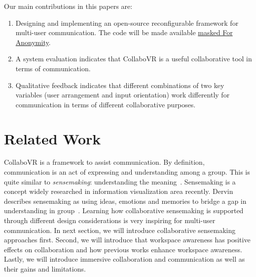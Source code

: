 \documentclass{sigchi}
\begin{document}
Our main contributions in this papers are:
\begin{enumerate}
    \item Designing and implementing an open-source reconfigurable framework for multi-user communication. The code will be made available \url{masked For Anonymity}.
    \item A system evaluation indicates that CollaboVR is a useful collaborative tool in terms of communication.
    \item Qualitative feedback indicates that different combinations of two key variables (user arrangement and input orientation) work differently for communication in terms of different collaborative purposes.
\end{enumerate}


\section{Related Work}
CollaboVR is a framework to assist communication. By definition, communication is an act of expressing and understanding among a group. This is quite similar to \textit{sensemaking}: understanding the meaning~\cite{paul2009understanding}. Sensemaking is a concept widely researched in information visualization area recently. Dervin describes sensemaking as using ideas, emotions and memories to bridge a gap in understanding in group~\cite{dervin1992mind}. Learning how collaborative sensemaking is supported through different design considerations is very inspiring for multi-user communication. In next section, we will introduce collaborative sensemaking approaches first. Second, we will introduce that workspace awareness has positive effects on collaboration and how previous works enhance workspace awareness. Lastly, we will introduce immersive collaboration and communication as well as their gains and limitations.
\end{document}
